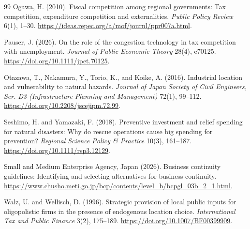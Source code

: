 \begin{thebibliography}{99}
Ogawa, H. (2010).
\newblock Fiscal competition among regional governments: Tax competition, expenditure competition and externalities.
\newblock \emph{Public Policy Review} 6(1), 1--30.
\url{https://ideas.repec.org/a/mof/journl/ppr007a.html}.

Pauser, J. (2026).
\newblock On the role of the congestion technology in tax competition with unemployment.
\newblock \emph{Journal of Public Economic Theory} 28(4), e70125.
\url{https://doi.org/10.1111/jpet.70125}.

Otazawa, T., Nakamura, Y., Torio, K., and Koike, A. (2016).
\newblock Industrial location and vulnerability to natural hazards.
\newblock \emph{Journal of Japan Society of Civil Engineers, Ser. D3 (Infrastructure Planning and Management)} 72(1), 99--112. \url{https://doi.org/10.2208/jscejipm.72.99}.

Seshimo, H. and Yamazaki, F. (2018).
\newblock Preventive investment and relief spending for natural disasters: Why do rescue operations cause big spending for prevention?
\newblock \emph{Regional Science Policy \& Practice} 10(3), 161--187. \url{https://doi.org/10.1111/rsp3.12129}.

Small and Medium Enterprise Agency, Japan (2026).
\newblock Business continuity guidelines: Identifying and selecting alternatives for business continuity.
\newblock \url{https://www.chusho.meti.go.jp/bcp/contents/level_b/bcpgl_03b_2_1.html}.

Walz, U. and Wellisch, D. (1996).
\newblock Strategic provision of local public inputs for oligopolistic firms in the presence of endogenous location choice.
\newblock \emph{International Tax and Public Finance} 3(2), 175--189. \url{https://doi.org/10.1007/BF00399909}.

\end{thebibliography}
